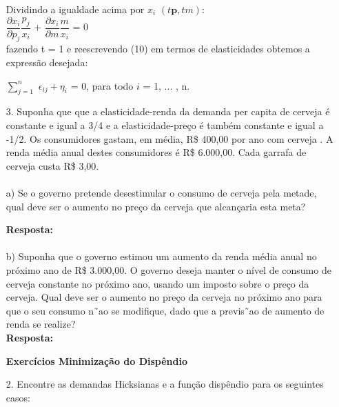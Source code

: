 \begin{enumerate}
Dividindo a igualdade acima por {$x_{i}$} {$(t\textbf{p}, tm)$}:\\

{$\dfrac{\partial x_{i}}{\partial p_{j}}$}{$\dfrac{p_{j}}{x_{i}}$} +
{$\dfrac{\partial x_{i}}{\partial m}$}{$\dfrac{m}{x_{i}}$} = 0\\

fazendo t = 1 e reescrevendo (10) em termos de elasticidades obtemos a expressão desejada:

{$\displaystyle \sum_{j=1}^{n}$} {$\epsilon_{ij} + \eta_{i}$} = 0,  para todo {$i$} = 1, ... , n.\\


\item[3.] Suponha que que a elasticidade-renda da demanda per capita de cerveja é constante e igual a 3/4 e a elasticidade-preço é também constante e igual a -1/2. Os consumidores gastam, em média, R\$ 400,00 por ano com cerveja . A renda média anual destes consumidores é R\$ 6.000,00. Cada garrafa de cerveja custa R\$ 3,00.

\paragraph{}a) Se o governo pretende desestimular o consumo de cerveja pela metade, qual deve ser o
aumento no preço da cerveja que alcançaria esta meta?

\textbf{Resposta:}\\

\paragraph{}b) Suponha que o governo estimou um aumento da renda média anual no próximo ano de R\$ 3.000,00. O governo deseja manter o nível de consumo de cerveja constante no próximo ano, usando um imposto sobre o preço da cerveja. Qual deve ser o aumento no preço da cerveja no próximo ano para que o seu consumo n˜ao se modifique, dado que a previs˜ao de aumento de renda se realize?\\

\textbf{Resposta:}\\

\newpage

\begin{center}
\textbf{Exercícios Minimização do Dispêndio}\\
\end{center}

\item[2.] Encontre as demandas Hicksianas e a função dispêndio para os seguintes casos:\\


\end{enumerate}
